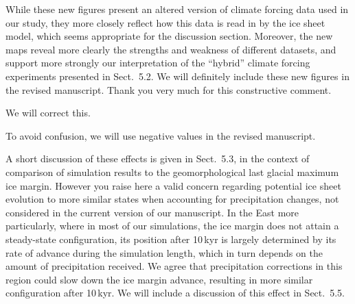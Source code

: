 \documentclass[10pt]{article}
\begin{document}
While these new figures present an altered version of climate forcing data used in our study, they more closely reflect how this data is read in by the ice sheet model, which seems appropriate for the discussion section. Moreover, the new maps reveal more clearly the strengths and weakness of different datasets, and support more strongly our interpretation of the ``hybrid'' climate forcing experiments presented in Sect.~5.2. We will definitely include these new figures in the revised manuscript. Thank you very much for this constructive comment.


We will correct this.


To avoid confusion, we will use negative values in the revised manuscript.


A short discussion of these effects is given in Sect.~5.3, in the context of comparison of simulation results to the geomorphological last glacial maximum ice margin. However you raise here a valid concern regarding potential ice sheet evolution to more similar states when accounting for precipitation changes, not considered in the current version of our manuscript. In the East more particularly, where in most of our simulations, the ice margin does not attain a steady-state configuration, its position after 10\,kyr is largely determined by its rate of advance during the simulation length, which in turn depends on the amount of precipitation received. We agree that precipitation corrections in this region could slow down the ice margin advance, resulting in more similar configuration after 10\,kyr. We will include a discussion of this effect in Sect.~5.5.
\end{document}
